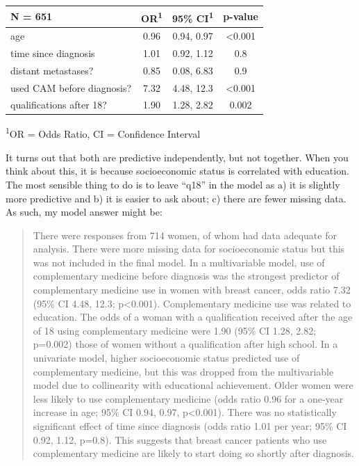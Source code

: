 \documentclass[]{book}
\begin{document}
\captionsetup[table]{labelformat=empty,skip=1pt}
\begin{longtable}{lccc}
\toprule
\textbf{N = 651} & \textbf{OR}\textsuperscript{1} & \textbf{95\% CI}\textsuperscript{1} & \textbf{p-value} \\ 
\midrule
age & 0.96 & 0.94, 0.97 & <0.001 \\ 
time since diagnosis & 1.01 & 0.92, 1.12 & 0.8 \\ 
distant metastases? & 0.85 & 0.08, 6.83 & 0.9 \\ 
used CAM before diagnosis? & 7.32 & 4.48, 12.3 & <0.001 \\ 
qualifications after 18? & 1.90 & 1.28, 2.82 & 0.002 \\ 
\bottomrule
\end{longtable}
\vspace{-5mm}
\begin{minipage}{\linewidth}
\textsuperscript{1}OR = Odds Ratio, CI = Confidence Interval \\ 
\end{minipage}

It turns out that both are predictive independently, but not together.
When you think about this, it is because socioeconomic status is
correlated with education. The most sensible thing to do is to leave
``q18'' in the model as a) it is slightly more predictive and b) it is
easier to ask about; c) there are fewer missing data. As such, my model
answer might be:

\begin{quote}
There were responses from 714 women, of whom had data adequate for
analysis. There were more missing data for socioeconomic status but this
was not included in the final model. In a multivariable model, use of
complementary medicine before diagnosis was the strongest predictor of
complementary medicine use in women with breast cancer, odds ratio 7.32
(95\% CI 4.48, 12.3; p\textless0.001). Complementary medicine use was
related to education. The odds of a woman with a qualification received
after the age of 18 using complementary medicine were 1.90 (95\% CI
1.28, 2.82; p=0.002) those of women without a qualification after high
school. In a univariate model, higher socioeconomic status predicted use
of complementary medicine, but this was dropped from the multivariable
model due to collinearity with educational achievement. Older women were
less likely to use complementary medicine (odds ratio 0.96 for a
one-year increase in age; 95\% CI 0.94, 0.97, p\textless0.001). There
was no statistically significant effect of time since diagnosis (odds
ratio 1.01 per year; 95\% CI 0.92, 1.12, p=0.8). This suggests that
breast cancer patients who use complementary medicine are likely to
start doing so shortly after diagnosis.
\end{quote}
\end{document}
